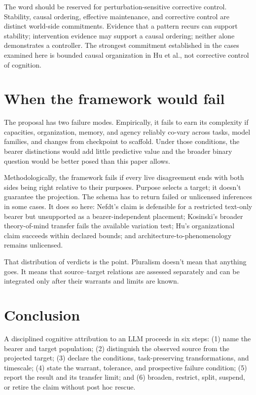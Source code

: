 \documentclass[12pt]{article}
\begin{document}
The word  should be reserved for perturbation-sensitive corrective control. Stability, causal ordering, effective maintenance, and corrective control are distinct world-side commitments. Evidence that a pattern recurs can support stability; intervention evidence may support a causal ordering; neither alone demonstrates a controller. The strongest commitment established in the cases examined here is bounded causal organization in Hu et al., not corrective control of cognition.

\section{When the framework would fail}

The proposal has two failure modes. Empirically, it fails to earn its complexity if capacities, organization, memory, and agency reliably co-vary across tasks, model families, and changes from checkpoint to scaffold. Under those conditions, the bearer distinctions would add little predictive value and the broader binary question would be better posed than this paper allows.

Methodologically, the framework fails if every live disagreement ends with both sides being right relative to their purposes. Purpose selects a target; it doesn't guarantee the projection. The schema has to return failed or unlicensed inferences in some cases. It does so here: Nefdt's claim is defensible for a restricted text-only bearer but unsupported as a bearer-independent placement; Kosinski's broader theory-of-mind transfer fails the available variation test; Hu's organizational claim succeeds within declared bounds; and architecture-to-phenomenology remains unlicensed.

That distribution of verdicts is the point. Pluralism doesn't mean that anything goes. It means that source--target relations are assessed separately and can be integrated only after their warrants and limits are known.

\section{Conclusion}

A disciplined cognitive attribution to an LLM proceeds in six steps: (1) name the bearer and target population; (2) distinguish the observed source from the projected target; (3) declare the conditions, task-preserving transformations, and timescale; (4) state the warrant, tolerance, and prospective failure condition; (5) report the result and its transfer limit; and (6) broaden, restrict, split, suspend, or retire the claim without post hoc rescue.
\end{document}
